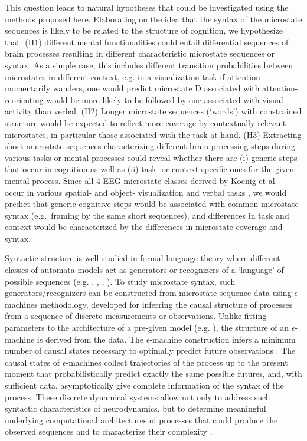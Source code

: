 \documentclass[journal]{IEEEtran}
\begin{document}
This question leads to natural hypotheses that could be investigated using the methods proposed here. Elaborating on the idea that the syntax of the microstate sequences is likely
to be related to the structure of cognition, 
we hypothesize that: (H1) different mental functionalities could entail differential  sequences of brain processes resulting in different characteristic microstate sequences or syntax.
 As a simple case, this includes different transition probabilities between microstates in different context, e.g. in a visualization task if attention momentarily wanders, one would predict microstate D associated with attention-reorienting would be more likely to
be followed by one associated with visual activity than verbal.  
(H2) Longer microstate sequences (`words') with constrained structure would be expected to reflect more coverage by contextually relevant microstates, in particular those associated with the task at hand.
(H3) Extracting short microstate sequences characterizing different brain processing steps during various tasks or mental processes could reveal whether there are (i) generic steps that occur in cognition as well as (ii) task- or context-specific ones for the given mental process. Since all 4 EEG microstate classes derived by Koenig et al.~\cite{Koenig2002} occur in various spatial- and object- visualization and verbal tasks  \cite{Milz2016}, 
we would predict that generic cognitive steps would be associated with common microstate syntax (e.g.~framing by the same short sequences), and differences in task and context would be characterized by the differences in microstate coverage and syntax.

Syntactic structure is well studied in formal language theory where different classes of automata models act as generators or recognizers of a `language' of possible sequences (e.g. \cite{Hopcroft}, \cite{EilenbergB}, 
\cite{Nehaniv1996}, \cite{wildbook}).  To study microstate syntax, such generators/recognizers can be constructed from microstate sequence data using $\epsilon$-machines methodology, developed for inferring the causal structure of processes from a sequence of discrete measurements or observations.  Unlike fitting parameters to the architecture of a pre-given model (e.g. \cite{Gaertner2010}), the structure of an $\epsilon$-machine is derived from the data. The $\epsilon$-machine construction infers a minimum number of causal states necessary to optimally predict future observations \cite{CrutchfieldYoung1989,Shalizi2003}. The causal states of $\epsilon$-machines collect trajectories of the process up to the present moment that probabilistically predict exactly the same possible futures, and, with sufficient data, asymptotically give complete information of the syntax of the process. These discrete dynamical systems allow not only to address such syntactic characteristics of neurodynamics, but to determine meaningful underlying computational architectures of processes that could produce the observed sequences and to characterize their complexity  \cite{Crutchfield1993}. 
\end{document}
